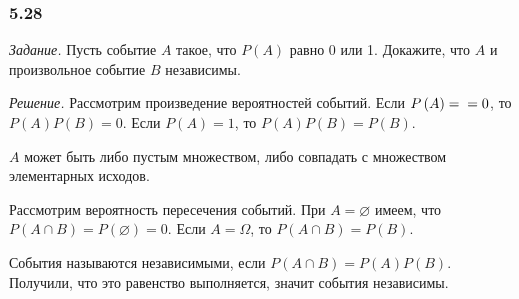 \subsubsection*{5.28}

\textit{Задание.} Пусть событие $A$ такое, что $P \left( A \right) $ равно 0 или 1.
Докажите, что $A$ и произвольное событие $B$ независимы.

\textit{Решение.} Рассмотрим произведение вероятностей событий.
Если $P \left( A \right) = \\ = 0$, то $P \left( A \right) P \left( B \right) = 0$.
Если $P \left( A \right) = 1$, то $P \left( A \right) P \left( B \right) = P \left( B \right) $.

$A$ может быть либо пустым множеством, либо совпадать с множеством элементарных исходов.

Рассмотрим вероятность пересечения событий. При $A = \varnothing$ имеем, что $P \left( A \cap B \right) = P \left( \varnothing \right) = 0$.
Если $A = \Omega $, то $P \left( A \cap B \right) = P \left( B \right) $.

События называются независимыми, если $P \left( A \cap B \right) = P \left( A \right) P \left( B \right) $.
Получили, что это равенство выполняется, значит события независимы.
